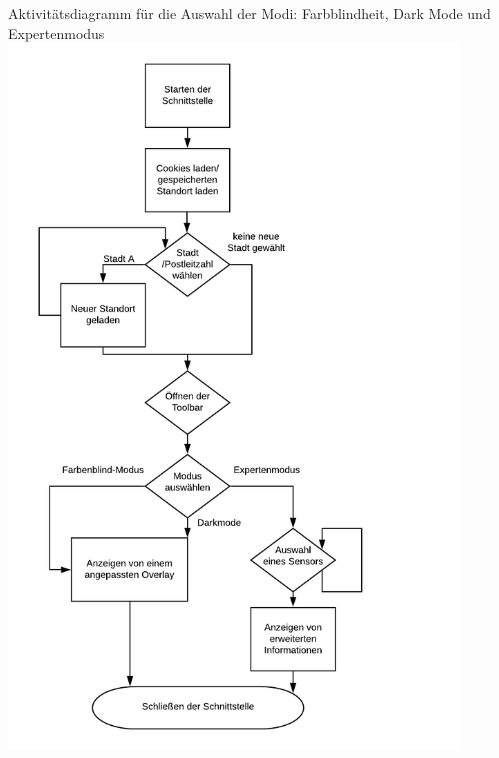 Aktivitätsdiagramm für die Auswahl der Modi: Farbblindheit, Dark Mode und Expertenmodus
\includegraphics[width=0.9\textwidth]{media/AuswahlModi} 
\newline

